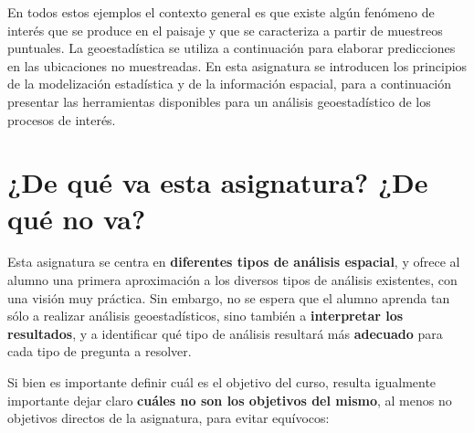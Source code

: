 \documentclass[
  letterpaper,
  DIV=11,
  numbers=noendperiod]{scrreprt}
\begin{document}
En todos estos ejemplos el contexto general es que existe algún fenómeno
de interés que se produce en el paisaje y que se caracteriza a partir de
muestreos puntuales. La geoestadística se utiliza a continuación para
elaborar predicciones en las ubicaciones no muestreadas. En esta
asignatura se introducen los principios de la modelización estadística y
de la información espacial, para a continuación presentar las
herramientas disponibles para un análisis geoestadístico de los procesos
de interés.

\hypertarget{de-quuxe9-va-esta-asignatura-de-quuxe9-no-va}{%
\section*{¿De qué va esta asignatura? ¿De qué no
va?}\label{de-quuxe9-va-esta-asignatura-de-quuxe9-no-va}}


Esta asignatura se centra en \textbf{diferentes tipos de análisis
espacial}, y ofrece al alumno una primera aproximación a los diversos
tipos de análisis existentes, con una visión muy práctica. Sin embargo,
no se espera que el alumno aprenda tan sólo a realizar análisis
geoestadísticos, sino también a \textbf{interpretar los resultados}, y a
identificar qué tipo de análisis resultará más \textbf{adecuado} para
cada tipo de pregunta a resolver.

Si bien es importante definir cuál es el objetivo del curso, resulta
igualmente importante dejar claro \textbf{cuáles no son los objetivos
del mismo}, al menos no objetivos directos de la asignatura, para evitar
equívocos:
\end{document}
